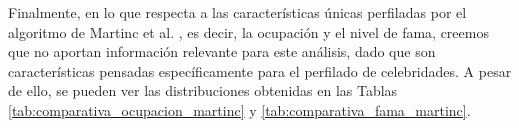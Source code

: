 Finalmente, en lo que respecta a las características únicas perfiladas por el algoritmo de Martinc et al. \cite{martinc2019hot}, es decir, la ocupación y el nivel de fama,
creemos que no aportan información relevante para este análisis, dado que son características pensadas
específicamente para el perfilado de celebridades. A pesar de ello, se pueden ver las distribuciones obtenidas en las
Tablas \ref{tab:comparativa_ocupacion_martinc} y \ref{tab:comparativa_fama_martinc}.

\bigskip
\begin{table}[H]
	\centering
	\caption{Distribución de ocupación obtenida por el algoritmo de Martinc et al. \cite{martinc2019hot}}
	\label{tab:comparativa_ocupacion_martinc}
\end{table}

